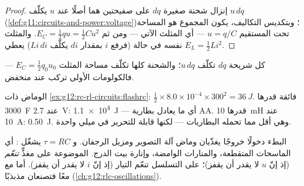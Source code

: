 \begin{proof}
إنزال شحنة صغيرة $dq$ على صفيحتين هما أصلًا عند  $u$ يكلّف
$u\,dq$ (\cref{def:g11:circuits-and-power:voltage})؛ وبتكديس
التكاليف، يكون المجموع هو المساحة تحت المستقيم $u = q/C$ --- أي المثلث
الآتي --- ومن ثم $E_C = \tfrac12 qu = \tfrac12 Cu^2$. والمثلث نفسه في حالة
 (فرفع $i$ بمقدار $di$ يكلّف $Li\,di$) يعطي
$E_L = \tfrac12 Li^2$.
\end{proof}

\begin{omfigure}

{\small كل شريحة $dq$ تكلّف $u\,dq$؛ والشحنة كلها تكلّف
مساحة المثلث $E_C = \tfrac12 q_0 u_0$ --- فالكولومات الأولى تركب
عند  منخفض.}
\end{omfigure}

\begin{example}\label{ex:g12:rc-rl-circuits:energies}
 الوماض ذات \cref{ex:g12:rc-rl-circuits:flashrc}:
$\tfrac12 \times 8.0\times10^{-4} \times 300^2 = \qty{36}{J}$.  فائقة
قدرها \qty{3000}{F} عند \qty{2.7}{V}: \qty{1.1e4}{J} --- أي ما يعادل
بطارية AA.  قدرها \qty{10}{mH} عند \qty{10}{A}: \qty{0.50}{J}.
وهي أقل مما تحمله البطاريات --- لكنها قابلة للتحرير في ميلي  واحدة.
\end{example}

\begin{remark}\label{rem:g12:rc-rl-circuits:applications}
البطء دخولًا  خروجًا يغذّيان وماض آلة التصوير ومزيل الرجفان. و
 $\tau = RC$ يشغّل : أي الماسحات المتقطعة، والمنارات
الوامضة، وإنارة بيت الدرج.  الموضوعة على مغذٍّ \emph{تنعّم}
 (إذ إنّ $u$ لا يقدر أن يقفز)؛  على التسلسل تنعّم التيار (إذ إنّ $i$ لا يقدر
أن يقفز). أما  مع  معًا فتصنعان مذبذبًا
(\cref{ch:g12:rlc-oscillations}).
\end{remark}

